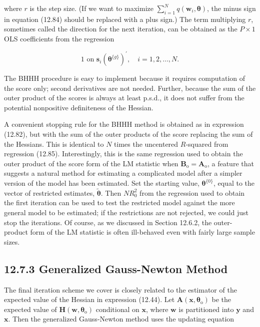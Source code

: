 \documentclass[10pt]{article}
\begin{document}
where $r$ is the step size. (If we want to maximize $\sum_{i=1}^{N} q\left(\mathbf{w}_{i}, \boldsymbol{\theta}\right)$, the minus sign in equation (12.84) should be replaced with a plus sign.) The term multiplying $r$, sometimes called the direction for the next iteration, can be obtained as the $P \times 1$ OLS coefficients from the regression


\begin{equation*}
1 \text { on } \mathbf{s}_{i}\left(\boldsymbol{\theta}^{\{g\}}\right)^{\prime}, \quad i=1,2, \ldots, N . \tag{12.85}
\end{equation*}


The BHHH procedure is easy to implement because it requires computation of the score only; second derivatives are not needed. Further, because the sum of the outer product of the scores is always at least p.s.d., it does not suffer from the potential nonpositive definiteness of the Hessian.

A convenient stopping rule for the BHHH method is obtained as in expression (12.82), but with the sum of the outer products of the score replacing the sum of the Hessians. This is identical to $N$ times the uncentered $R$-squared from regression (12.85). Interestingly, this is the same regression used to obtain the outer product of the score form of the LM statistic when $\mathbf{B}_{\mathrm{o}}=\mathbf{A}_{\mathrm{o}}$, a feature that suggests a natural method for estimating a complicated model after a simpler version of the model has been estimated. Set the starting value, $\boldsymbol{\theta}^{\{0\}}$, equal to the vector of restricted estimates, $\tilde{\boldsymbol{\theta}}$. Then $N R_{0}^{2}$ from the regression used to obtain the first iteration can be used to test the restricted model against the more general model to be estimated; if the restrictions are not rejected, we could just stop the iterations. Of course, as we discussed in Section 12.6.2, the outer-product form of the LM statistic is often ill-behaved even with fairly large sample sizes.

\subsection*{12.7.3 Generalized Gauss-Newton Method}
The final iteration scheme we cover is closely related to the estimator of the expected value of the Hessian in expression (12.44). Let $\mathbf{A}\left(\mathbf{x}, \boldsymbol{\theta}_{\mathrm{o}}\right)$ be the expected value of $\mathbf{H}\left(\mathbf{w}, \boldsymbol{\theta}_{\mathrm{o}}\right)$ conditional on $\mathbf{x}$, where $\mathbf{w}$ is partitioned into $\mathbf{y}$ and $\mathbf{x}$. Then the generalized Gauss-Newton method uses the updating equation
\end{document}
